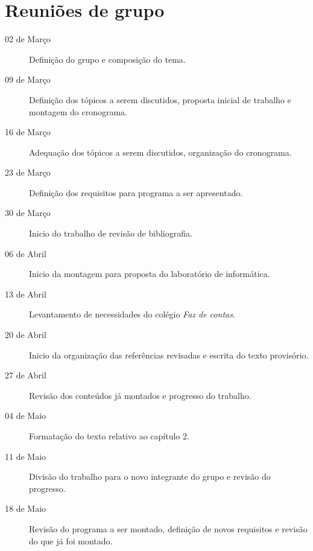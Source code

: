 \documentclass[a4paper,12pt]{report}
\begin{document}
    \appendix

    \chapter{Reuniões de grupo}

    \begin{description}

        \item[02 de Março] Definição do grupo e composição do tema.

        \item[09 de Março] Definição dos tópicos a serem discutidos, proposta
        inicial de trabalho e montagem do cronograma.

        \item[16 de Março] Adequação dos tópicos a serem discutidos, organização
        do cronograma.

        \item[23 de Março] Definição dos requisitos para programa a ser
        apresentado.

        \item[30 de Março] Inicio do trabalho de revisão de bibliografia.

        \item[06 de Abril] Inicio da montagem para proposta do laboratório de
        informática.

        \item[13 de Abril] Levantamento de necessidades do colégio \emph{Faz de
        contas}.

        \item[20 de Abril] Inicio da organização das referências revisadas e
        escrita do texto provisório.

        \item[27 de Abril] Revisão dos conteúdos já montados e progresso do
        trabalho.

        \item[04 de Maio] Formatação do texto relativo ao capítulo 2.

        \item[11 de Maio] Divisão do trabalho para o novo integrante do grupo e
        revisão do progresso.

        \item[18 de Maio] Revisão do programa a ser montado, definição de novos
        requisitos e revisão do que já foi montado.

    \end{description}
\end{document}
